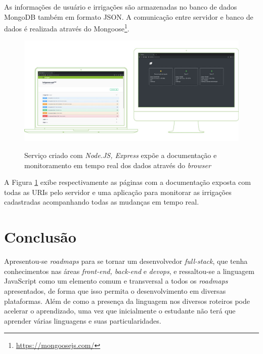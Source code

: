 \documentclass[
	12pt,				%
	openright,			%
	twoside,			%
	a4paper,			%
	english,			%
	brazil				%
	]{abntex2}
\begin{document}
As informações de usuário e irrigações são armazenadas no banco de dados MongoDB também em formato JSON. A comunicação entre servidor e banco de dados é realizada através do Mongoose\footnote{\url{https://mongoosejs.com/}}.

\begin{figure}[h]
	\centering

    \caption{Serviço criado com \textit{Node.JS, Express} expõe a documentação e monitoramento em tempo real dos dados através do \textit{browser}} \label{fig:ServerAppExample}
    \includegraphics[scale=0.46]{server-app} \\

\end{figure}

A Figura \ref{fig:ServerAppExample} exibe respectivamente as páginas com a documentação exposta com todas as URIs pelo servidor e uma aplicação para monitorar as irrigações cadastradas acompanhando todas as mudanças em tempo real.


\chapter{Conclusão}
\label{cap:Conclusao}

Apresentou-se \textit{roadmaps} para se tornar um desenvolvedor \textit{full-stack}, que tenha conhecimentos nas áreas \textit{front-end, back-end} e \textit{devops}, e ressaltou-se a linguagem JavaScript como um elemento comum e transversal a todos os \textit{roadmaps} apresentados, de forma que isso permita o desenvolvimento em diversas plataformas. Além de como a presença da linguagem nos diversos roteiros pode acelerar o aprendizado, uma vez que inicialmente o estudante não terá que aprender várias linguagens e suas particularidades.
\end{document}

